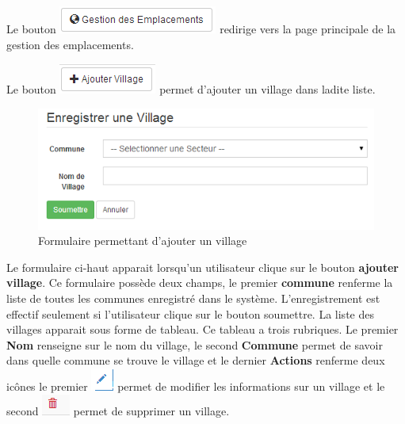 \documentclass[12pt,a4paper]{report}
\begin{document}
Le bouton \includegraphics[scale=0.7]{pic/GestionEmplacement.png} redirige vers la page principale de la gestion des emplacements.

Le bouton \includegraphics[scale=0.7]{pic/AddVillage.png} permet d'ajouter un village dans ladite liste.

\begin{figure}[h]
\begin{center}
\includegraphics[width=14cm]{pic/FormAddVillage.png}
\end{center}
\caption{Formulaire permettant d'ajouter un village}
\label{Formulaire permettant d'ajouter un village}
\end{figure}

Le formulaire ci-haut apparait lorsqu'un utilisateur clique sur le bouton \textbf{ajouter village}. Ce formulaire possède deux champs, le premier \textbf{commune} renferme la liste de toutes les communes enregistré dans le système. 
L'enregistrement est effectif seulement si l'utilisateur clique sur le bouton soumettre. La liste des villages apparait sous forme de tableau. Ce tableau a trois rubriques. Le premier \textbf{Nom} renseigne sur le nom du village, le second \textbf{Commune} permet de savoir dans quelle commune se trouve le village et le dernier \textbf{Actions} renferme deux icônes le premier \includegraphics[scale=0.7]{pic/EditUser.png}  permet de modifier les informations sur un village et le second \includegraphics[scale=0.7]{pic/DeleteWRed.png}  permet de supprimer un village.
\end{document}
